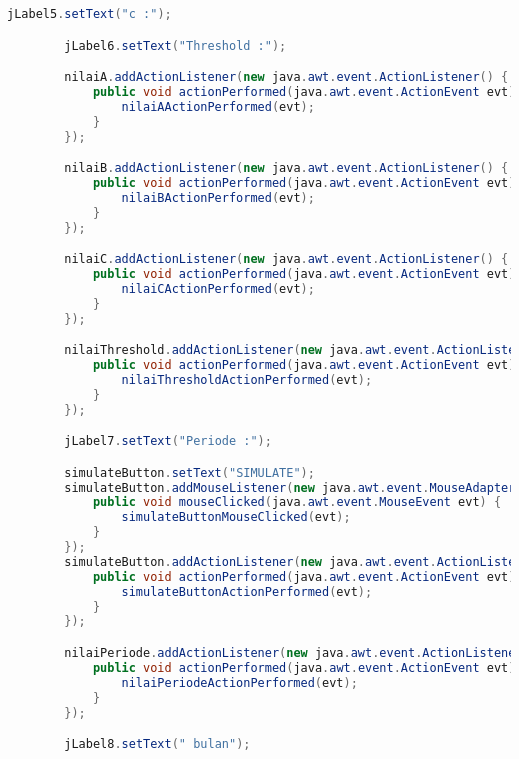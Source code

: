 \begin{lstlisting}[language=Java, caption=Entrepreneurs.java]
        jLabel5.setText("c :");

        jLabel6.setText("Threshold :");

        nilaiA.addActionListener(new java.awt.event.ActionListener() {
            public void actionPerformed(java.awt.event.ActionEvent evt) {
                nilaiAActionPerformed(evt);
            }
        });

        nilaiB.addActionListener(new java.awt.event.ActionListener() {
            public void actionPerformed(java.awt.event.ActionEvent evt) {
                nilaiBActionPerformed(evt);
            }
        });

        nilaiC.addActionListener(new java.awt.event.ActionListener() {
            public void actionPerformed(java.awt.event.ActionEvent evt) {
                nilaiCActionPerformed(evt);
            }
        });

        nilaiThreshold.addActionListener(new java.awt.event.ActionListener() {
            public void actionPerformed(java.awt.event.ActionEvent evt) {
                nilaiThresholdActionPerformed(evt);
            }
        });

        jLabel7.setText("Periode :");

        simulateButton.setText("SIMULATE");
        simulateButton.addMouseListener(new java.awt.event.MouseAdapter() {
            public void mouseClicked(java.awt.event.MouseEvent evt) {
                simulateButtonMouseClicked(evt);
            }
        });
        simulateButton.addActionListener(new java.awt.event.ActionListener() {
            public void actionPerformed(java.awt.event.ActionEvent evt) {
                simulateButtonActionPerformed(evt);
            }
        });

        nilaiPeriode.addActionListener(new java.awt.event.ActionListener() {
            public void actionPerformed(java.awt.event.ActionEvent evt) {
                nilaiPeriodeActionPerformed(evt);
            }
        });

        jLabel8.setText(" bulan");


\end{lstlisting}
